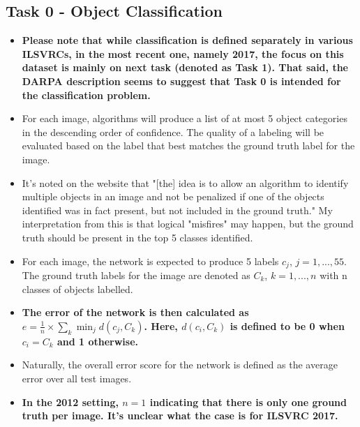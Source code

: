 \documentclass{article}
\begin{document}
\subsection{Task 0 - Object Classification}
\begin{itemize}
    \item \textbf{Please note that while classification is defined separately in various ILSVRCs, in the most recent one, namely 2017, the focus on this dataset is mainly on next task (denoted as Task 1). That said, the DARPA description seems to suggest that Task 0 is intended for the classification problem.}
    \item For each image, algorithms will produce a list of at most 5 object categories in the descending order of confidence. The quality of a labeling will be evaluated based on the label that best matches the ground truth label for the image.
    \item It's noted on the website that "[the] idea is to allow an algorithm to identify multiple objects in an image and not be penalized if one of the objects identified was in fact present, but not included in the ground truth." My interpretation from this is that logical "misfires" may happen, but the ground truth should be present in the top 5 classes identified.
    \item For each image, the network is expected to produce 5 labels $c_j$, $j = 1,...,55$. The ground truth labels for the image are denoted as $C_k$, $k=1,...,n$ with n classes of objects labelled.
    \item \textbf{The error of the network is then calculated as $e = \frac{1}{n} \times \sum_k \min_j d(c_j, C_k)$. Here, $d(c_i, C_k)$ is defined to be 0 when $c_i = C_k$ and 1 otherwise.}
    \item Naturally, the overall error score for the network is defined as the average error over all test images.
    \item \textbf{In the 2012 setting, $n = 1$ indicating that there is only one ground truth per image. It's unclear what the case is for ILSVRC 2017.}
\end{itemize}
\end{document}
